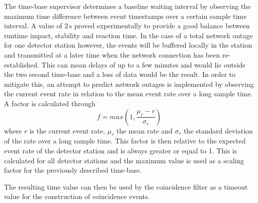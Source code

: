 \documentclass[abstract,toc,los,lof,english,10pt,glossary,acronyms]{jluthesis}
\begin{document}
The time-base supervisor determines a baseline waiting interval by observing the maximum time difference between event timestamps over a certain sample time interval. A value of $2\,\text{s}$ proved experimentally to provide a good balance between runtime impact, stability and reaction time. In the case of a total network outage for one detector station however, the events will be buffered locally in the station and transmitted at a later time when the network connection has been re-established. This can mean delays of up to a few minutes and would lie outside the two second time-base and a loss of data would be the result. In order to mitigate this, an attempt to predict network outages is implemented by observing the current event rate in relation to the mean event rate over a long sample time. A factor is calculated through
\begin{equation*}
	f = max(1, \frac{\mu_{r} - r}{\sigma_{r}})
\end{equation*}
where $r$ is the current event rate, $\mu_{r}$ the mean rate and $\sigma_{r}$ the standard deviation of the rate over a long sample time. This factor is then relative to the expected event rate of the detector station and is always greater or equal to 1. This is calculated for all detector stations and the maximum value is used as a scaling factor for the previously described time-base.

The resulting time value can then be used by the coincidence filter as a timeout value for the construction of coincidence events.
\end{document}
